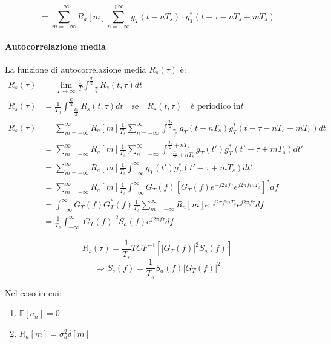 \[
    = \sum_{m=-\infty}^{+\infty} R_a[m] \sum_{n=-\infty}^{+\infty} g_T(t - nT_s) \cdot g_T^*(t - \tau - nT_s + mT_s)
\]

\paragraph*{Autocorrelazione media}

La funzione di autocorrelazione media \( \overline{R}_s(\tau) \) è:
\begin{align*}
    \overline{R}_s(\tau) & = \lim_{T\to\infty} \frac{1}{T} \int_{-\frac{T}{2}}^{\frac{T}{2}} R_s(t, \tau) dt                                                                   \\
    \overline{R}_s(\tau) & = \frac{1}{T_0} \int_{-\frac{T_0}{2}}^{\frac{T_0}{2}} R_s(t,\tau)dt \quad \text{se} \quad R_s(t,\tau) \quad \text{è periodico in} t           \\
    \overline{R}_s(\tau) & = \sum_{m=-\infty}^{\infty} R_a[m] \frac{1}{T_s} \sum_{n=-\infty}^{\infty} \int_{-\frac{T_s}{2}}^{\frac{T_s}{2}} g_T(t-nT_s)g_T^*(t-\tau-nT_s+mT_s)dt   \\
                         & = \sum_{m=-\infty}^{\infty} R_a[m] \frac{1}{T_s} \sum_{n=-\infty}^{\infty}\int_{-\frac{T_s}{2}+nT_s}^{\frac{T_s}{2}+nT_s} g_T(t')g_T^*(t'-\tau+mT_s)dt' \\
                         & = \sum_{m=-\infty}^{\infty} R_a[m] \frac{1}{T_s} \int_{-\infty}^{\infty} g_T(t')g_T^*(t'-\tau+mT_s)dt'                                                  \\
                         & = \sum_{m=-\infty}^{\infty} R_a[m] \frac{1}{T_s} \int_{-\infty}^{\infty} G_T(f)[G_T(f)e^{-j2\pi f\tau}e^{j2\pi fmT_s}]^*df                              \\
                         & = \int_{-\infty}^{\infty} G_T(f)G_T^*(f)\frac{1}{T_s} \sum_{m=-\infty}^{\infty} R_a[m] e^{-j2\pi fmT_s}e^{j2\pi f\tau}df                                \\
                         & = \frac{1}{T_s} \int_{-\infty}^{\infty} |G_T(f)|^2 S_a(f)e^{j2\pi f\tau}df
\end{align*}


\[
    \overline{R}_s(\tau) = \frac{1}{T_s} TCF^{-1} \left[ |G_T(f)|^2 S_a(f) \right]
\]
\[
    \Rightarrow S_s(f) = \frac{1}{T_s} S_a(f) |G_T(f)|^2
\]

Nel caso in cui:
\begin{enumerate}
    \item $\mathbb{E} [ a_n ] = 0$
    \item $R_a[m] = \sigma_a^2 \delta[m]$
\end{enumerate}

